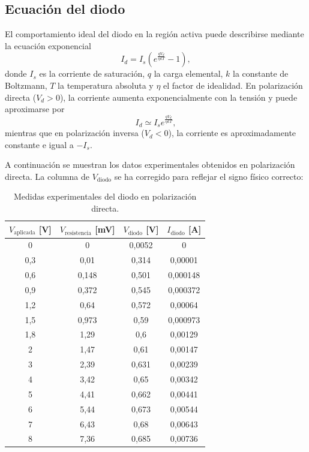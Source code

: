 \documentclass[a4paper,12pt]{article}
\begin{document}
\subsection{Ecuación del diodo}

El comportamiento ideal del diodo en la región activa puede describirse mediante la ecuación exponencial
\begin{equation}
I_d = I_s \left(e^{\frac{q V_d}{\eta k T}} - 1\right),
\end{equation}
donde \(I_s\) es la corriente de saturación, \(q\) la carga elemental, \(k\) la constante de Boltzmann, \(T\) la temperatura absoluta y \(\eta\) el factor de idealidad. En polarización directa (\(V_d>0\)), la corriente aumenta exponencialmente con la tensión y puede aproximarse por
\begin{equation}
I_d \simeq I_s e^{\frac{q V_d}{\eta k T}},
\end{equation}
mientras que en polarización inversa (\(V_d<0\)), la corriente es aproximadamente constante e igual a \(-I_s\).

A continuación se muestran los datos experimentales obtenidos en polarización directa. La columna de \(V_{\text{diodo}}\) se ha corregido para reflejar el signo físico correcto:

\begin{table}[h]
\centering
\begin{tabular}{S S S S}
\hline
{$V_{\text{aplicada}}$ [V]} & {$V_{\text{resistencia}}$ [mV]} & {$V_{\text{diodo}}$ [V]} & {$I_{\text{diodo}}$ [A]} \\
   & 0     & 0,0052 & 0 \\
0,3 & 0,01  & 0,314  & 0,00001 \\
0,6 & 0,148 & 0,501  & 0,000148 \\
0,9 & 0,372 & 0,545  & 0,000372 \\
1,2 & 0,64  & 0,572  & 0,00064 \\
1,5 & 0,973 & 0,59   & 0,000973 \\
1,8 & 1,29  & 0,6    & 0,00129 \\
2   & 1,47  & 0,61   & 0,00147 \\
3   & 2,39  & 0,631  & 0,00239 \\
4   & 3,42  & 0,65   & 0,00342 \\
5   & 4,41  & 0,662  & 0,00441 \\
6   & 5,44  & 0,673  & 0,00544 \\
7   & 6,43  & 0,68   & 0,00643 \\
8   & 7,36  & 0,685  & 0,00736 \\
\hline
\end{tabular}
\caption{Medidas experimentales del diodo en polarización directa.}
\label{tab:diodo_directa}
\end{table}
\end{document}
